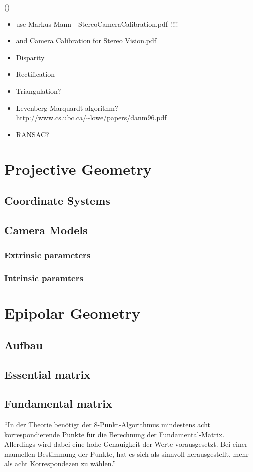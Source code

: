 (\cite{Hartley.2011})
\begin{itemize}
\item use Markus Mann - StereoCameraCalibration.pdf !!!!
\item and Camera Calibration for Stereo Vision.pdf
\item Disparity
\item Rectification
\item Triangulation?
\item Levenberg-Marquardt algorithm? \url{http://www.cs.ubc.ca/~lowe/papers/danm96.pdf}
\item RANSAC?
\end{itemize}

\section{Projective Geometry}
\subsection{Coordinate Systems}

\subsection{Camera Models}
\subsubsection{Extrinsic parameters}
\subsubsection{Intrinsic paramters}

\section{Epipolar Geometry}
\subsection{Aufbau}
\subsection{Essential matrix}
\subsection{Fundamental matrix}
\enquote{In der Theorie benötigt der 8-Punkt-Algorithmus mindestens acht korrespondierende Punkte für die Berechnung der Fundamental-Matrix. Allerdings wird dabei eine hohe Genauigkeit der Werte vorausgesetzt. Bei einer manuellen Bestimmung der Punkte, hat es sich als sinnvoll herausgestellt, mehr als acht Korrespondezen zu wählen.}


